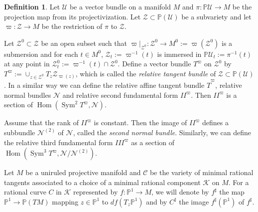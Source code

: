 \documentclass[12pt]{amsart}
\theoremstyle{plain}
\theoremstyle{definition}
\newtheorem{definition} [theorem] {Definition}
\def\Sym{\operatorname{Sym}}
\def\Hom{\operatorname{Hom}}
\begin{document}
\begin{definition}

Let $\mathcal U$ be a   vector bundle on a manifold $M$ and $\pi: \mathbb P \mathcal U \rightarrow M$ be the projection map from its projectivization. Let $\mathcal Z \subset \mathbb P(\mathcal U)$ be a subvariety  and let $\varpi: \mathcal Z \rightarrow   M$ be the restriction of $\pi$ to $\mathcal Z$.

Let $\mathcal Z^0\subset \mathcal Z$ be an open subset  such that $\varpi|_{\mathcal Z^0}: \mathcal Z^0 \rightarrow M^0:=\varpi(\mathcal Z^0)$ is a submersion and for each $t \in M^0$, $\mathcal Z_t:=   \varpi^{-1}(t) $ is immersed in $\mathbb P \mathcal U_t:=\pi^{-1}(t)$ at any point in $ \mathcal Z^0_t:= \varpi^{-1}(t) \cap \mathcal Z^0$.
Define a vector bundle $T^{\varpi}$ on $\mathcal Z^0$ by $T^{\varpi}:=\cup_{z\in \mathcal Z^0} T_{z} \mathcal Z_{\varpi(z)}$, which is called the \emph{relative tangent bundle} of $\mathcal Z \subset \mathbb P(\mathcal U)$. In a similar way we can define the relative affine tangent bundle $\widehat {T}^{\varpi}$,  relative normal bundles $\mathcal N $ and  relative second  fundamental form  $II^{\varpi}$. Then
$II^{\varpi}$ is a section of $\Hom(\Sym^2 T^{\varpi}, \mathcal N)$.

Assume that the rank of $II^{\varpi}$ is constant. Then the image of $II^{\varpi}$ defines a subbundle $\mathcal N^{(2)}$ of $\mathcal N$, called the \emph{second  normal bundle}. Similarly, we can define the relative third fundamental form $III^{\varpi}$ as a section of $\Hom(\Sym^3 T^{\varpi}, \mathcal N/\mathcal N^{(2)})$.

\end{definition}


Let $M$ be a uniruled projective manifold and $ \mathcal C$ be the variety of minimal rational tangents associated to a choice of a minimal rational component $\mathcal K$ on $M$.
For a rational curve $C$ in $\mathcal K$ represented by $f: \mathbb P^1 \rightarrow M$, we will denote by  $f^{\sharp}$   the map $\mathbb P^1 \rightarrow \mathbb P(TM)$ mapping $z \in \mathbb P^1$ to $df(T_z\mathbb P^1)$ and by $C^{\sharp}$ the image $f^{\sharp}(\mathbb P^1)$ of $f^{\sharp}$.
\end{document}
